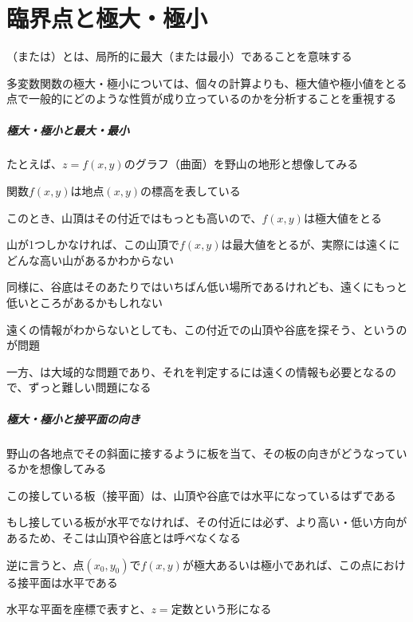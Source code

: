 \documentclass[../book_jiriki_calc]{subfiles}
\begin{document}
\section{臨界点と極大・極小}

（または）とは、局所的に最大（または最小）であることを意味する

多変数関数の極大・極小については、個々の計算よりも、極大値や極小値をとる点で一般的にどのような性質が成り立っているのかを分析することを重視する

\sectionline

\subparagraph{極大・極小と最大・最小}

たとえば、$z=f(x,y)$のグラフ（曲面）を野山の地形と想像してみる

関数$f(x, y)$は地点$(x,y)$の標高を表している

\br

このとき、山頂はその付近ではもっとも高いので、$f(x, y)$は極大値をとる

山が1つしかなければ、この山頂で$f(x,y)$は最大値をとるが、実際には遠くにどんな高い山があるかわからない

同様に、谷底はそのあたりではいちばん低い場所であるけれども、遠くにもっと低いところがあるかもしれない

\br

遠くの情報がわからないとしても、この付近での山頂や谷底を探そう、というのが問題

\br

一方、は大域的な問題であり、それを判定するには遠くの情報も必要となるので、ずっと難しい問題になる

\sectionline

\subparagraph{極大・極小と接平面の向き}

野山の各地点でその斜面に接するように板を当て、その板の向きがどうなっているかを想像してみる

\br

この接している板（接平面）は、山頂や谷底では水平になっているはずである

もし接している板が水平でなければ、その付近には必ず、より高い・低い方向があるため、そこは山頂や谷底とは呼べなくなる

\br

逆に言うと、点$(x_0, y_0)$で$f(x, y)$が極大あるいは極小であれば、この点における接平面は水平である

\br

水平な平面を座標で表すと、$z=\text{定数}$という形になる
\end{document}
